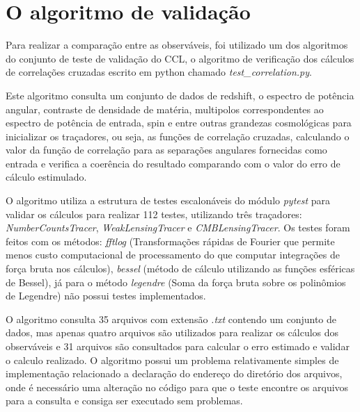 \section*{O algoritmo de validação}

Para realizar a comparação entre as observáveis, foi utilizado um dos algoritmos do conjunto de teste de validação do CCL, o algoritmo de verificação dos cálculos de correlações cruzadas escrito em python chamado  \textit{test\_correlation.py}.

Este algoritmo consulta um conjunto de dados de redshift, o espectro de potência angular, contraste de densidade de matéria, multipolos correspondentes ao espectro de potência de entrada, spin e entre outras grandezas cosmológicas para inicializar os traçadores, ou seja, as funções de correlação cruzadas, calculando o valor da função de correlação para as separações angulares fornecidas como entrada e verifica a coerência do resultado comparando com o valor do erro de cálculo estimulado.

O algoritmo utiliza a estrutura de testes escalonáveis do módulo \textit{pytest} para validar os cálculos para realizar 112 testes, utilizando três traçadores:  \textit{NumberCountsTracer}, \textit{WeakLensingTracer} e \textit{CMBLensingTracer}. Os testes foram feitos com os métodos: \textit{fftlog} (Transformações rápidas de Fourier que permite menos custo computacional de processamento do que computar integrações de força bruta nos cálculos), \textit{bessel} (método de cálculo utilizando as funções esféricas de Bessel), já para o método \textit{legendre} (Soma da força bruta sobre os polinômios de Legendre) não possui testes implementados.

O algoritmo consulta 35 arquivos com extensão \textit{.txt} contendo um conjunto de dados, mas apenas quatro arquivos são utilizados para realizar os cálculos dos observáveis e 31 arquivos são consultados para calcular o erro estimado e validar o calculo realizado. O algoritmo possui um problema relativamente simples de implementação relacionado a declaração do endereço do diretório dos arquivos, onde é necessário uma alteração no código para que o teste encontre os arquivos para a consulta e consiga ser executado sem problemas. 

